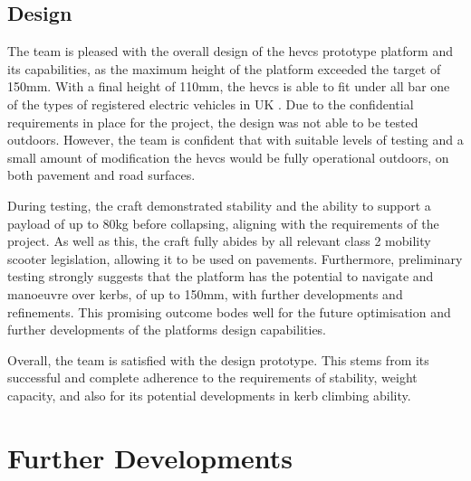 \documentclass [12pt]{article}
\begin{document}
\subsection{Design}

The team is pleased with the overall design of the \gls{hevcs} prototype platform and its capabilities, as the maximum height of the platform exceeded the target of 150mm. With a final height of 110mm, the \gls{hevcs} is able to fit under all bar one of the types of registered electric vehicles in UK \cite{carsinit}. Due to the confidential requirements in place for the project, the design was not able to be tested outdoors. However, the team is confident that with suitable levels of testing and a small amount of modification the \gls{hevcs} would be fully operational outdoors, on both pavement and road surfaces.

During testing, the craft demonstrated stability and the ability to support a payload of up to 80kg before collapsing, aligning with the requirements of the project. As well as this, the craft fully abides by all relevant class 2 mobility scooter legislation, allowing it to be used on pavements.  Furthermore, preliminary testing strongly suggests that the platform has the potential to navigate and manoeuvre over kerbs, of up to 150mm, with further developments and refinements. This promising outcome bodes well for the future optimisation and further developments of the platforms design capabilities.

Overall, the team is satisfied with the design prototype. This stems from its successful and complete adherence to the requirements of stability, weight capacity, and also for its potential developments in kerb climbing ability.

\newpage
\section{Further Developments}
\end{document}
